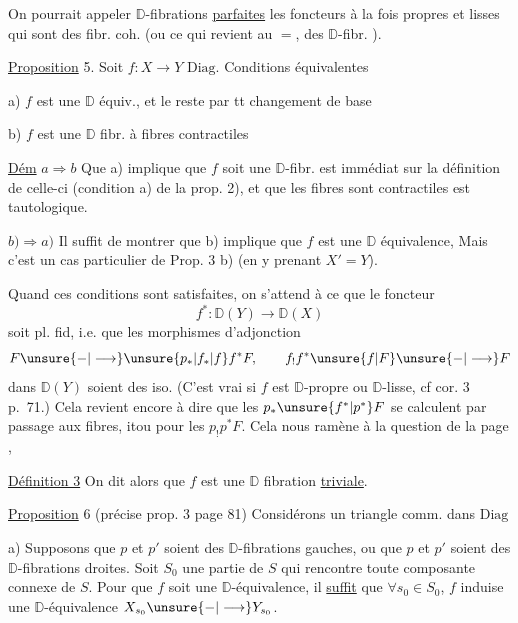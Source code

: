 On pourrait appeler $\mathbb D$-fibrations \uline{parfaites} les foncteurs à la fois propres et lisses qui sont des fibr. coh. (ou ce qui revient au $=$, des $\mathbb D$-fibr. ).

 \uline{Proposition} 5. Soit $f:X\longrightarrow Y$  $\mathrm{Diag}$. Conditions équivalentes

a) \deleted{\unsure{$\forall$}} $f$ est une $\mathbb D$ équiv., et le reste par tt changement de base

b) $f$ est une $\mathbb D$ fibr. à fibres contractiles

\uline{Dém} $a\Longrightarrow b$ Que  a) implique que $f$ soit une $\mathbb D$-fibr. est immédiat sur la définition de celle-ci (condition a) de la prop. 2), et que les fibres sont contractiles est tautologique.

$b)\Longrightarrow a)$ Il suffit de montrer que b) implique que $f$ est une $\mathbb D$ équivalence, Mais c'est un cas particulier de Prop. 3 b) (en y prenant $X'=Y$).

Quand ces conditions sont satisfaites, on s'attend à ce que le foncteur
\[
f^*:\mathbb D(Y)\longrightarrow\mathbb D(X)
\]
soit pl. fid, i.e. que les morphismes d'adjonction
\[
F\unsure{-|\longrightarrow} \unsure{p_*|f_*|f} f^*F,\qquad f_! f^*\unsure{f|F}\unsure{-|\longrightarrow} F
\]
dans $\mathbb D(Y)$ soient des iso. (C'est vrai si $f$ est $\mathbb D$-propre ou $\mathbb D$-lisse, cf cor. 3 p.~71.) Cela revient encore à dire que les $p_*\unsure{f^*|p^*}F$ se calculent par passage aux fibres,   itou pour les $p_!p^*F$. Cela nous ramène à la question de la page ,

\uline{Définition 3} On dit alors que $f$ est une $\mathbb D$ fibration \uline{triviale}.

\uline{Proposition} 6 (précise prop. 3 page 81) Considérons un triangle comm. dans $\mathrm{Diag}$

a)  Supposons que $p$ et $p'$ soient des $\mathbb D$-fibrations gauches, ou que $p$ et $p'$ soient des $\mathbb D$-fibrations droites. Soit  $S_0$ une partie de $S$ qui rencontre toute composante connexe de $S$. Pour que $f$ soit une $\mathbb D$-équivalence, il \uline{suffit} que $\forall s_0\in S_0$, $f$ induise une $\mathbb D$-équivalence $X_{s_0}\unsure{-|\longrightarrow} Y_{s_0}$.

